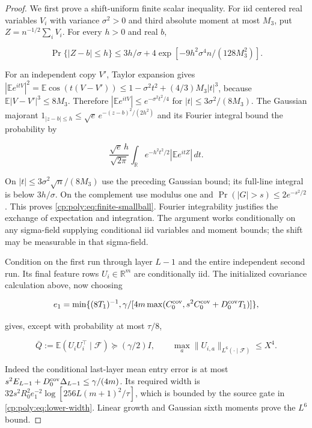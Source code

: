 \begin{proof}

We first prove a shift-uniform finite scalar inequality. For iid centered
real variables $V_i$ with variance $\sigma^2>0$ and third absolute moment
at most $M_3$, put $Z=n^{-1/2}\sum_iV_i$. For every $h>0$ and real $b$,

\begin{equation}
\Pr\{|Z-b|\le h\}\le3h/\sigma
 +4\exp[-9h^2\sigma^4n/(128M_3^2)].
\label{cp:poly:eq:finite-smallball}
\end{equation}

For an independent copy $V'$, Taylor expansion gives
$|\mathbb Ee^{itV}|^2=\mathbb E\cos(t(V-V'))
\le1-\sigma^2t^2+(4/3)M_3|t|^3$, because
$\mathbb E|V-V'|^3\le8M_3$. Therefore
$|\mathbb Ee^{itV}|\le e^{-\sigma^2t^2/4}$ for
$|t|\le3\sigma^2/(8M_3)$.
The Gaussian majorant
$1_{|z-b|\le h}\le\sqrt e\,e^{-(z-b)^2/(2h^2)}$ and its Fourier
integral bound the probability by

\[
\frac{\sqrt e\,h}{\sqrt{2\pi}}
 \int_{\mathbb R}e^{-h^2t^2/2}|\mathbb Ee^{itZ}|\,dt.
\]

On $|t|\le3\sigma^2\sqrt n/(8M_3)$ use the preceding Gaussian
bound; its full-line integral is below $3h/\sigma$.
On the complement use modulus one and
$\Pr(|G|>s)\le2e^{-s^2/2}$. This proves
\eqref{cp:poly:eq:finite-smallball}. Fourier integrability justifies the
exchange of expectation and integration. The argument works conditionally
on any sigma-field supplying conditional iid variables and moment bounds;
the shift may be measurable in that sigma-field.

Condition on the first run through layer $L-1$ and the entire independent
second run. Its final feature rows $U_i\in\mathbb R^m$ are conditionally
iid. The initialized covariance calculation above, now choosing

\[
e_1=\min\{(8T_1)^{-1},
 \gamma/[4m\max(C_0^{\rm cov},s^2C_0^{\rm cov}+D_0^{\rm cov}T_1)]\},
\]

gives, except with probability at most $\tau/8$,

\[
\bar Q:=\mathbb E(U_iU_i^\top\mid\mathcal F)\succeq(\gamma/2)I,
\qquad \max_a\|U_{i,a}\|_{L^6(\cdot\mid\mathcal F)}\le X^4.
\]

Indeed the conditional last-layer mean entry error is at most
$s^2E_{L-1}+D_0^{\rm cov}\Delta_{L-1}\le\gamma/(4m)$.
Its required width is
$32s^2R_0^2e_1^{-2}\log[256L(m+1)^2/\tau]$, which is bounded by
the source gate in \eqref{cp:poly:eq:lower-width}. Linear growth
and Gaussian sixth moments prove the $L^6$ bound.


\end{proof}
